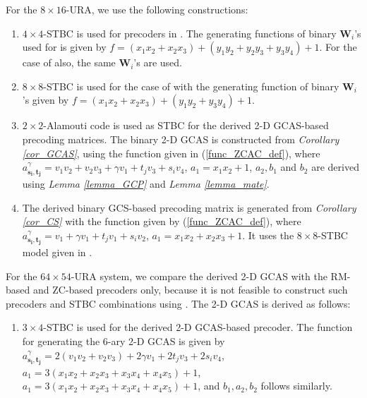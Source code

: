 \documentclass[pdflatex,sn-mathphys-num]{sn-jnl}%
\theoremstyle{thmstyleone}
\begin{document}
	For the $8 \times 16$-URA, we use the following constructions:
	\begin{enumerate}
		\item  $4\times4$-STBC is used for precoders in \cite{OmniChen, YuboGCAS}. The generating functions of binary $\mathbf{W}_i$'s used for \cite{YuboGCAS} is given by $f= (x_1 x_2 + x_2 x_3) + (y_1 y_2 + y_2 y_3 + y_3 y_4)+1$. For the case of \cite{OmniChen} also, the same $\mathbf{W}_i$'s are used.
		
		\item $8\times8$-STBC is used for the case of \cite{YuboGCAS2} with the generating function of binary $\mathbf{W}_i$'s given by $f= (x_1 x_2 + x_2 x_3) + (y_1 y_2 + y_3 y_4)+1$.
		
		\item $2\times2$-Alamouti code \cite{Alamouti} is used as STBC for the derived 2-D GCAS-based precoding matrices. The binary 2-D GCAS is constructed from \textit{Corollary \ref{cor_GCAS}}, using the function given in (\ref{func_ZCAC_def}), where $a_{\mathbf{s_i},\mathbf{t_j}}^\gamma= v_1 v_2 +v_2 v_3 + \gamma v_1 + t_j  v_3+  s_i  v_4 $, $a_1= x_1 x_2 +1$, $a_2, b_1$ and $b_2$ are derived using \textit{Lemma \ref{lemma_GCP}} and \textit{Lemma \ref{lemma_mate}}.
		
		\item The derived binary GCS-based precoding matrix is generated from \textit{Corollary \ref{cor_CS}} with the function given by (\ref{func_ZCAC_def}), where $a_{\mathbf{s_i},\mathbf{t_j}}^\gamma= v_1 + \gamma v_1 + t_j  v_1+  s_i  v_2 $, $a_1= x_1 x_2 + x_2 x_3+ 1$.  It uses the $8\times8$-STBC model given in \cite{STBC}.
	\end{enumerate}
	
	
	For the $64 \times 54$-URA system, we compare the derived 2-D GCAS with the RM-based and ZC-based precoders only, because it is not feasible to construct such precoders and STBC combinations using \cite{OmniChen,YuboGCAS,YuboGCAS2,ZilongLiuOmni2024,YuboMIMO2024}. The 2-D GCAS is derived as follows:
	\begin{enumerate}
		\item $3 \times 4$-STBC is used for the derived 2-D GCAS-based precoder. The function for generating the $6$-ary 2-D GCAS is given by $a_{\mathbf{s_i},\mathbf{t_j}}^\gamma= 2 (v_1 v_2 + v_2 v_3) + 2 \gamma v_1  + 2t_j  v_3+  2 s_i  v_4 $, $a_1= 3 (x_1 x_2 + x_2 x_3+ x_3 x_4+ x_4 x_5)+ 1$, $a_1= 3 (x_1 x_2 + x_2 x_3+ x_3 x_4+ x_4 x_5)+ 1$, and $b_1, a_2, b_2$ follows similarly.
	\end{enumerate}
	
\end{document}
